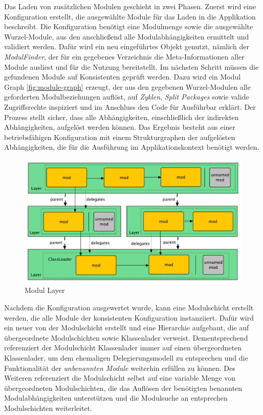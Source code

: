      Das Laden von zusätzlichen Modulen geschieht in zwei Phasen. Zuerst wird eine Konfiguration erstellt, die ausgewählte Module für das Laden in die Applikation beschreibt. Die Konfiguration benötigt eine Modulmenge sowie die ausgewählte Wurzel-Module, aus den anschließend alle Modulabhängigkeiten ermittelt und validiert werden. Dafür wird ein neu eingeführtes Objekt genutzt, nämlich der \textit{ModulFinder}, der für ein gegebenes Verzeichnis die Meta-Informationen aller Module ausliest und für die Nutzung bereitstellt. \newline
     Im nächsten Schritt müssen die gefundenen Module auf Konsistenten geprüft werden. Dazu wird ein Modul Graph \ref{fig:module-graph} erzeugt, der aus den gegebenen Wurzel-Modulen alle geforderten Modulbeziehungen auflöst, auf \textit{Zyklen}, \textit{Split Packages} sowie valide Zugriffsrechte inspiziert und im Anschluss den Code für Ausführbar erklärt. Der Prozess stellt sicher, dass alle Abhängigkeiten, einschließlich der indirekten Abhängigkeiten, aufgelöst werden können.\newline
     Das Ergebnis besteht aus einer betriebsfähigen Konfiguration mit einem Strukturgraphen der aufgelösten Abhängigkeiten, die für die Ausführung im Applikationskontext benötigt werden. \cite{java9modRevealed}\bigbreak 

    \begin{figure}[h!]
      \centering
      \includegraphics[width=\textwidth]{material/images/module-layer.pdf}
      \caption{Modul Layer \cite{javaMod9}}
      \label{fig:module-layer}
    \end{figure}

    Nachdem die Konfiguration ausgewertet wurde, kann eine Modulschicht erstellt werden, die alle Module der konsistenten Konfiguration instanziiert. Dafür wird ein neuer von der Modulschicht erstellt und eine Hierarchie aufgebaut, die auf übergeordnete Modulschichten sowie Klassenlader verweist. Dementsprechend referenziert der Modulschicht Klassenlader immer auf einen übergeordneten Klassenlader, um dem ehemaligen Delegierungsmodell zu entsprechen und die Funktionalität der \textit{unbenannten Module} weiterhin erfüllen zu können. Des Weiteren referenziert die Modulschicht selbst auf eine variable Menge von übergeordneten Modulschichten, die das Auflösen der benötigten benannten Modulabhängigkeiten unterstützen und die Modulsuche an entsprechen Modulschichten weiterleitet. \bigbreak

